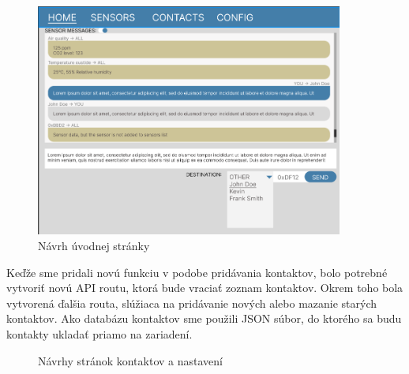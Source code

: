 \documentclass[slovak,master]{diploma}
\begin{document}
\begin{figure}[h!]
  \centering
  \includegraphics[width=0.9\textwidth]{Figures/figmaHome.png}
  \caption{Návrh úvodnej stránky}
  \label{fig:figmaHome}
\end{figure}

Keďže sme pridali novú funkciu v podobe pridávania kontaktov, bolo potrebné vytvoriť novú API routu, ktorá bude 
vraciať zoznam kontaktov. Okrem toho bola vytvorená ďalšia routa, slúžiaca na pridávanie nových alebo mazanie starých kontaktov. 
Ako databázu kontaktov sme použili JSON súbor, do ktorého sa budu kontakty ukladať priamo na zariadení.

\begin{figure}[h!]
  \centering
  \qquad
  \caption{Návrhy stránok kontaktov a nastavení}
  \label{fig:figma2}
\end{figure}
\end{document}
